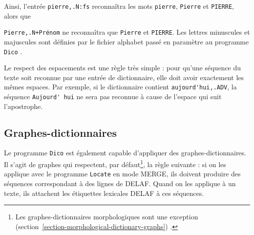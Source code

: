 \noindent Ainsi, l’entrée \verb$pierre,.N:fs$ reconnaîtra les mots \verb+pierre+,
\verb+Pierre+ et \verb+PIERRE+, alors que

\noindent \verb$Pierre,.N+Prénom$ ne reconnaîtra que \verb+Pierre+ et \verb+PIERRE+. Les lettres
minuscules et majuscules sont définies par le fichier alphabet passé en paramètre au programme
\verb+Dico+
.

\bigskip
\noindent Le respect des espacements est une règle très simple : pour qu’une séquence du texte
soit reconnue par une entrée de dictionnaire, elle doit avoir exactement les mêmes espaces.
Par exemple, si le dictionnaire contient \verb+aujourd'hui,.ADV+, la séquence \verb+Aujourd' hui+
ne sera pas reconnue à cause de l’espace qui suit l’apostrophe.


\subsection{Graphes-dictionnaires}
\label{section-dictionary-graphs}
Le programme \verb+Dico+ est également capable
d’appliquer des graphes-dictionnaires. Il s’agit de graphes qui respectent,
par défaut\footnote{Les graphes-dictionnaires morphologiques sont une exception
(section~\ref{section-morphological-dictionary-graphs}) .}, la règle suivante :
si on les applique avec le programme \verb+Locate+ en mode MERGE, ils doivent produire des séquences
correspondant à des lignes de DELAF.
Quand on les applique à un texte, ils attachent les étiquettes lexicales DELAF à ces séquences.


